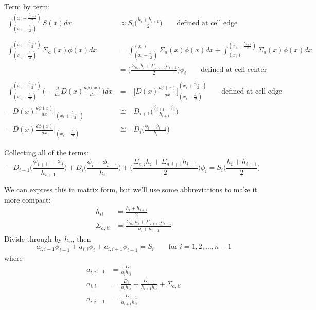 \documentclass[12pt]{article}
\begin{document}
Term by term:
\begin{align}
\int_{(x_i - \frac{h_i}{2})}^{(x_i + \frac{h_{i+1}}{2})} S(x) dx &\approx S_i \bigl(\frac{h_i + h_{i+1}}{2}\bigr) \qquad \text{defined at cell edge} \nonumber \\
&\nonumber\\
\int_{(x_i - \frac{h_i}{2})}^{(x_i + \frac{h_{i+1}}{2})} \Sigma_a(x) \phi(x) dx &= 
\int_{(x_i - \frac{h_i}{2})}^{(x_i)} \Sigma_a(x) \phi(x) dx + \int_{(x_i)}^{(x_i + \frac{h_{i+1}}{2})} \Sigma_a(x) \phi(x) dx \nonumber\\&=
\biggl(\frac{\Sigma_{a,i}h_i + \Sigma_{a,i+1}h_{i+1}}{2} \biggr)\phi_i\nonumber \qquad \text{defined at cell center}\\
&\nonumber\\
 \int_{(x_i - \frac{h_i}{2})}^{(x_i + \frac{h_{i+1}}{2})} \biggl(  -\frac{d}{dx}D(x)\frac{d \phi(x)}{dx}\biggr) dx &=
-\biggl[D(x)\frac{d \phi(x)}{dx} \biggr]_{(x_i - \frac{h_i}{2})}^{(x_i + \frac{h_{i+1}}{2})} \qquad \text{defined at cell edge}\nonumber \\
%
-D(x)\frac{d \phi(x)}{dx}\big|_{(x_i + \frac{h_{i+1}}{2})} &\cong -D_{i+1}\biggl(\frac{\phi_{i+1} - \phi_i}{h_{i+1}}\biggr) \nonumber \\
%
-D(x)\frac{d \phi(x)}{dx}\big|_{(x_i - \frac{h_i}{2})} &\cong -D_{i}\biggl(\frac{\phi_{i} - \phi_{i-1}}{h_{i}}\biggr) \nonumber
\end{align}

Collecting all of the terms:
%
\begin{equation}
-D_{i+1}\biggl(\frac{\phi_{i+1} - \phi_i}{h_{i+1}}\biggr) + D_{i}\biggl(\frac{\phi_{i} - \phi_{i-1}}{h_{i}}\biggr) + \biggl(\frac{\Sigma_{a,i}h_i + \Sigma_{a,i+1}h_{i+1}}{2} \biggr)\phi_i =   S_i \bigl(\frac{h_i + h_{i+1}}{2}\bigr) \nonumber
\end{equation}

We can express this in matrix form, but we'll use some abbreviations to make it more compact:
\begin{align}
h_{ii} &= \frac{h_i + h_{i+1}}{2} \nonumber \\
%
\Sigma_{a,ii} &= \frac{\Sigma_{a,i}h_i + \Sigma_{a,i+1}h_{i+1}}{h_i + h_{i+1}} \nonumber
\end{align}
Divide through by $h_{ii}$, then
%
\[a_{i,i-1} \phi_{i-1} + a_{i,i}\phi_i + a_{i, i+1} \phi_{i+1} = S_i \qquad \text{for } i = 1, 2, \dots, n-1\]
%
where
%
\begin{align}
a_{i,i-1} &= \frac{-D_i}{h_i h_{ii}} \nonumber \\
a_{i,i} &= \frac{D_i}{h_i h_{ii}} + \frac{D_{i+1}}{h_{i+1} h_{ii}} +\Sigma_{a,ii} \nonumber \\
a_{i,i+1} &= \frac{-D_{i+1}}{h_{i+1} h_{ii}} \nonumber
\end{align}
\end{document}
